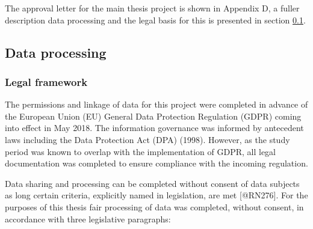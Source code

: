 \documentclass[]{article}
\begin{document}
The approval letter for the main thesis project is shown in Appendix D,
a fuller description data processing and the legal basis for this is
presented in section \ref{subsec:dat-process}.

\subsection{Data processing}\label{subsec:dat-process}

\subsubsection{Legal framework}\label{subsec:dat-legal}

The permissions and linkage of data for this project were completed in
advance of the European Union (EU) General Data Protection Regulation
(GDPR) coming into effect in May 2018. The information governance was
informed by antecedent laws including the Data Protection Act (DPA)
(1998). However, as the study period was known to overlap with the
implementation of GDPR, all legal documentation was completed to ensure
compliance with the incoming regulation.

Data sharing and processing can be completed without consent of data
subjects as long certain criteria, explicitly named in legislation, are
met {[}@RN276{]}. For the purposes of this thesis fair processing of
data was completed, without consent, in accordance with three
legislative paragraphs:
\end{document}
